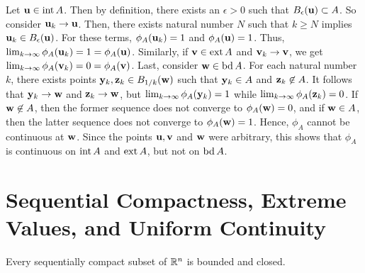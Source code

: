 \documentclass[letterpaper, twoside, 12pt]{book}
\begin{document}
\begin{solution}
    Let \(\mathbf u \in \operatorname{int} A\). Then by definition, there exists
    an \(\epsilon > 0\) such that \(B_{\epsilon}(\mathbf u) \subset A\).
    So consider \(\mathbf u_k \to \mathbf u\). Then, there exists natural
    number \(N\) such that \(k \geq N\) implies 
    \(\mathbf u_k \in B_{\epsilon}(\mathbf u)\). For these terms,
    \(\phi_A(\mathbf u_k) = 1\) and \(\phi_A(\mathbf u) = 1\). Thus,
    \(\lim_{k \to \infty} \phi_A(\mathbf u_k) = 1 = \phi_A(\mathbf u) \).
    Similarly, if \(\mathbf v \in \operatorname{ext} A\) and \(\mathbf v_k \to \mathbf v\),
    we get \(\lim_{k \to \infty} \phi_A(\mathbf v_k) = 0 = \phi_A(\mathbf v)\).
    Last, consider \(\mathbf w \in \operatorname{bd} A\). For each natural number \(k\),
    there exists points \(\mathbf y_k, \mathbf z_k \in B_{1/k}(\mathbf w)\)
    such that \(\mathbf y_k \in A\) and \(\mathbf z_k \not\in A\). It follows
    that \(\mathbf y_k \to \mathbf w\) and \(\mathbf z_k \to \mathbf w\), but
    \(\lim_{k \to \infty} \phi_A(\mathbf y_k) = 1\) while 
    \(\lim_{k \to \infty} \phi_A(\mathbf z_k) = 0\). If \(\mathbf w \not\in A\),
    then the former sequence does not converge to \(\phi_A(\mathbf w) = 0\), and
    if \(\mathbf w \in A\), then the latter sequence does not converge to
    \(\phi_A(\mathbf w) = 1\). Hence, \(\phi_A\) cannot be continuous at \(\mathbf w\).
    Since the points \(\mathbf u, \mathbf v\) and \(\mathbf w\) were arbitrary, this
    shows that \(\phi_A\) is continuous on \(\operatorname{int} A\) and \(\operatorname{ext} A\),
    but not on \(\operatorname{bd} A\).
\end{solution}

\section{Sequential Compactness, Extreme Values, and Uniform Continuity}

\begin{theorem}[11.16]
  Every sequentially compact subset of \(\mathbb R^n\) is bounded and closed.
\end{theorem}
\end{document}
